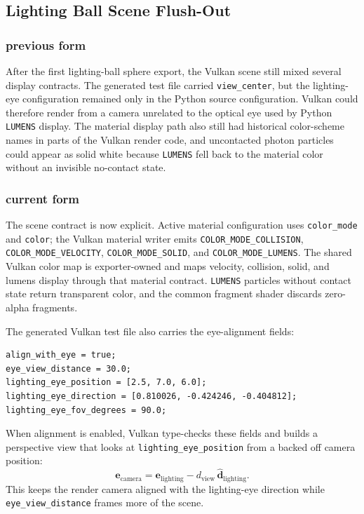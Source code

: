 \subsection{Lighting Ball Scene Flush-Out}

\subsubsection{previous form}

After the first lighting-ball sphere export, the Vulkan scene still mixed
several display contracts.  The generated test file carried
\texttt{view\_center}, but the lighting-eye configuration remained only in the
Python source configuration.  Vulkan could therefore render from a camera
unrelated to the optical eye used by Python \texttt{LUMENS} display.  The
material display path also still had historical color-scheme names in parts of
the Vulkan render code, and uncontacted photon particles could appear as solid
white because \texttt{LUMENS} fell back to the material color without an
invisible no-contact state.

\subsubsection{current form}

The scene contract is now explicit.  Active material configuration uses
\texttt{color\_mode} and \texttt{color}; the Vulkan material writer emits
\texttt{COLOR\_MODE\_COLLISION}, \texttt{COLOR\_MODE\_VELOCITY},
\texttt{COLOR\_MODE\_SOLID}, and \texttt{COLOR\_MODE\_LUMENS}.  The shared
Vulkan color map is exporter-owned and maps velocity, collision, solid, and
lumens display through that material contract.  \texttt{LUMENS} particles
without contact state return transparent color, and the common fragment shader
discards zero-alpha fragments.

The generated Vulkan test file also carries the eye-alignment fields:
\begin{verbatim}
align_with_eye = true;
eye_view_distance = 30.0;
lighting_eye_position = [2.5, 7.0, 6.0];
lighting_eye_direction = [0.810026, -0.424246, -0.404812];
lighting_eye_fov_degrees = 90.0;
\end{verbatim}
When alignment is enabled, Vulkan type-checks these fields and builds a
perspective view that looks at \texttt{lighting\_eye\_position} from a backed
off camera position:
\[
    \mathbf e_{\mathrm{camera}} =
    \mathbf e_{\mathrm{lighting}} -
    d_{\mathrm{view}}\,
    \widehat{\mathbf d}_{\mathrm{lighting}} .
\]
This keeps the render camera aligned with the lighting-eye direction while
\texttt{eye\_view\_distance} frames more of the scene.

